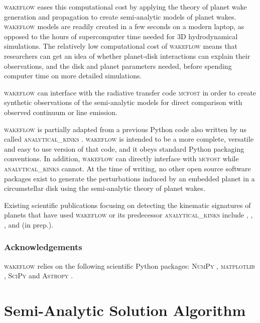 \textsc{wakeflow} eases this computational cost by applying the theory of planet wake generation and propagation \citep{goldreich1979,goodman2001,rafikov2002a,bollati2021} to create semi-analytic models of planet wakes. 
\textsc{wakeflow} models are readily created in a few seconds on a modern laptop, as opposed to the hours of supercomputer time needed for 3D hydrodynamical simulations. 
The relatively low computational cost of \textsc{wakeflow} means that researchers can get an idea of whether planet-disk interactions can explain their observations, and the disk and planet parameters needed, before spending computer time on more detailed simulations.

\textsc{wakeflow} can interface with the radiative transfer code \textsc{mcfost} \citep{pinte2006,pinte2009} in order to create synthetic observations of the semi-analytic models for direct comparison with observed continuum or line emission.

\textsc{wakeflow} is partially adapted from a previous Python code also written by us called \textsc{analytical\_kinks} \citep{bollati2021a}. 
\textsc{wakeflow} is intended to be a more complete, versatile and easy to use version of that code, and it obeys standard Python packaging conventions.
In addition, \textsc{wakeflow} can directly interface with \textsc{mcfost} while \textsc{analytical\_kinks} cannot.
At the time of writing, no other open source software packages exist to generate the perturbations induced by an embedded planet in a circumstellar disk using the semi-analytic theory of planet wakes.

Existing scientific publications focusing on detecting the kinematic signatures of planets that have used \textsc{wakeflow} or its predecessor \textsc{analytical\_kinks} include \citet{bollati2021}, \citet{calcino2022}, \citet{teague2022}, \citet{garg2022} and \citeauthor{fasanoinprep.} (in prep.).

\subsubsection{Acknowledgements}

\textsc{wakeflow} relies on the following scientific Python packages: \textsc{NumPy} \citep{harris2020}, \textsc{matplotlib} \citep{hunter2007}, \textsc{SciPy} \citep{virtanen2020} and \textsc{Astropy} \citep{astropycollaboration2022}.

\section{Semi-Analytic Solution Algorithm}

